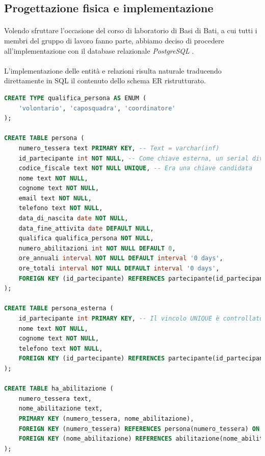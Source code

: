\documentclass[11pt,a4paper,english]{article}
\begin{document}
\subsection{Progettazione fisica e implementazione}

\paragraph{} Volendo sfruttare l'occasione del corso di laboratorio di Basi di Bati, a cui tutti i membri del gruppo di lavoro fanno parte, abbiamo deciso di procedere all'implementazione con il database relazionale \emph{PostgreSQL} \cite{postgre}. 

\paragraph{} L'implementazione delle entità e relazioni risulta naturale traducendo direttamente in SQL il contenuto dello schema ER ristrutturato. 

\begin{lstlisting}[language=SQL, caption=Esempio di implementazione di entità e relazioni]
CREATE TYPE qualifica_persona AS ENUM (
    'volontario', 'caposquadra', 'coordinatore'
);

CREATE TABLE persona (
    numero_tessera text PRIMARY KEY, -- Text = varchar(inf)
    id_partecipante int NOT NULL, -- Come chiave esterna, un serial diventa int | Il vincolo UNIQUE è controllato dal trigger apposito
    codice_fiscale text NOT NULL UNIQUE, -- Era una chiave candidata
    nome text NOT NULL,
    cognome text NOT NULL,
    email text NOT NULL,
    telefono text NOT NULL,
    data_di_nascita date NOT NULL,
    data_fine_attivita date DEFAULT NULL,
    qualifica qualifica_persona NOT NULL,
    numero_abilitazioni int NOT NULL DEFAULT 0,
    ore_annuali interval NOT NULL DEFAULT interval '0 days',
    ore_totali interval NOT NULL DEFAULT interval '0 days',
    FOREIGN KEY (id_partecipante) REFERENCES partecipante(id_partecipante) ON DELETE NO ACTION ON UPDATE CASCADE
);

CREATE TABLE persona_esterna (
    id_partecipante int PRIMARY KEY, -- Il vincolo UNIQUE è controllato dal trigger apposito
    nome text NOT NULL,
    cognome text NOT NULL,
    telefono text NOT NULL,
    FOREIGN KEY (id_partecipante) REFERENCES partecipante(id_partecipante) ON DELETE NO ACTION ON UPDATE CASCADE
);

CREATE TABLE ha_abilitazione (
    numero_tessera text,
    nome_abilitazione text,
    PRIMARY KEY (numero_tessera, nome_abilitazione),
    FOREIGN KEY (numero_tessera) REFERENCES persona(numero_tessera) ON DELETE CASCADE ON UPDATE CASCADE,
    FOREIGN KEY (nome_abilitazione) REFERENCES abilitazione(nome_abilitazione) ON DELETE CASCADE ON UPDATE CASCADE
);
\end{lstlisting}
\end{document}
